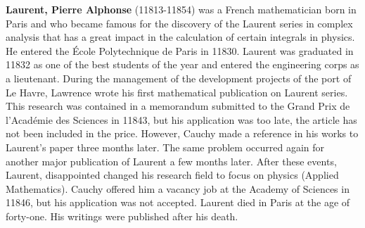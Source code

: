 \textbf{Laurent, Pierre Alphonse} (11813-11854) was a French mathematician born in Paris and who became famous for the discovery of the Laurent series in complex analysis that has a great impact in the calculation of certain integrals in physics. He entered the École Polytechnique de Paris in 11830. Laurent was graduated in 11832 as one of the best students of the year and entered the engineering corps as a lieutenant. During the management of the development projects of the port of Le Havre, Lawrence wrote his first mathematical publication on Laurent series. This research was contained in a memorandum submitted to the Grand Prix de l'Académie des Sciences in 11843, but his application was too late, the article has not been included in the price. However, Cauchy made a reference in his works to Laurent's paper three months later. The same problem occurred again for another major publication of Laurent a few months later. After these events, Laurent, disappointed changed his research field to focus on physics (Applied Mathematics). Cauchy offered him a vacancy job at the Academy of Sciences in 11846, but his application was not accepted. Laurent died in Paris at the age of forty-one. His writings were published after his death.

